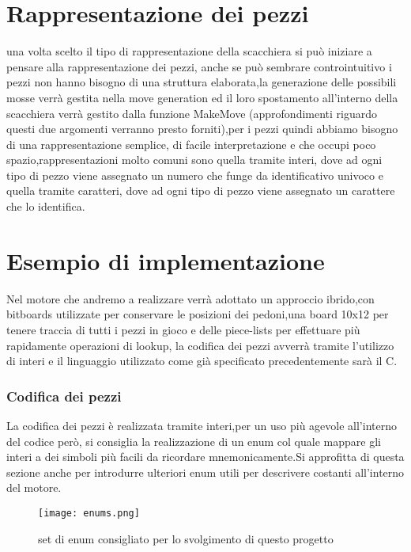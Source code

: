 \section{Rappresentazione dei pezzi}
una volta scelto il tipo di rappresentazione della scacchiera si può iniziare a pensare alla rappresentazione dei pezzi,
anche se può sembrare controintuitivo i pezzi non hanno bisogno di una struttura elaborata,la generazione delle possibili
mosse verrà gestita nella move generation ed il loro spostamento all'interno della scacchiera verrà gestito dalla funzione
MakeMove (approfondimenti riguardo questi due argomenti verranno presto forniti),per i pezzi quindi abbiamo bisogno di una
rappresentazione semplice, di facile interpretazione e che occupi poco spazio,rappresentazioni molto comuni sono quella
tramite interi, dove ad ogni tipo di pezzo viene assegnato un numero che funge da identificativo univoco e quella tramite
caratteri, dove ad ogni tipo di pezzo viene assegnato un carattere che lo identifica.


\section{Esempio di implementazione}
Nel motore che andremo a realizzare verrà adottato un approccio ibrido,con bitboards utilizzate per conservare le posizioni dei pedoni,una board 10x12 per tenere traccia di tutti i pezzi in gioco
e delle piece-lists per effettuare più rapidamente operazioni di lookup, la codifica dei pezzi avverrà tramite l'utilizzo di interi e il linguaggio utilizzato come già specificato precedentemente  sarà il C.

\subsubsection{Codifica dei pezzi} \label{codifica}
La codifica dei pezzi è realizzata tramite interi,per un uso più agevole all'interno del codice però, si consiglia la realizzazione
di un enum col quale mappare gli interi a dei simboli più facili da ricordare mnemonicamente.Si approfitta di questa sezione anche per introdurre
ulteriori enum utili per descrivere costanti all'interno del motore.
\begin{figure}[!ht]
    \texttt{[image: enums.png]}
    \caption{set di enum consigliato per lo svolgimento di questo progetto }
    \label{enums}
\end{figure}

